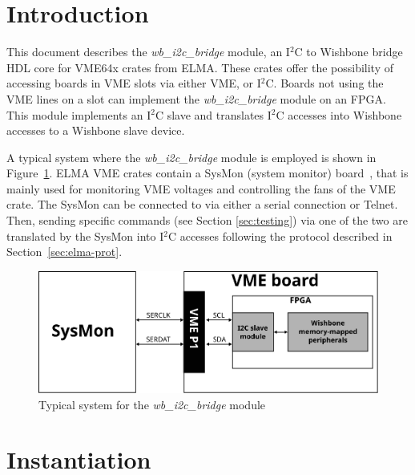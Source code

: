 \documentclass[a4paper,11pt]{article}
\begin{document}
\pagebreak
{}
\setcounter{page}{1}

\section{Introduction}
\label{sec:intro}

This document describes the \textit{wb\_i2c\_bridge} module, an I$^2$C to Wishbone
bridge HDL core for VME64x crates from ELMA. These crates offer the possibility of accessing
boards in VME slots via either VME, or I$^2$C. Boards not using the VME lines
on a slot can implement the \textit{wb\_i2c\_bridge} module on an FPGA. This module
implements an I$^2$C slave and translates I$^2$C accesses into Wishbone \cite{wb-spec}
accesses to a Wishbone slave device.

A typical system where the \textit{wb\_i2c\_bridge} module is employed is shown in
Figure~\ref{fig:sys}. ELMA VME crates contain a SysMon (system monitor) board~\cite{sysmon},
that is mainly used for monitoring VME voltages and controlling the fans of the VME crate.
The SysMon can be connected to via either a serial connection or Telnet. Then, sending
specific commands (see Section \ref{sec:testing}) via one of the two are translated by the
SysMon into I$^2$C accesses following the protocol described in Section~\ref{sec:elma-prot}.

\begin{figure}[h]
  \centerline{\includegraphics[width=\textwidth]{fig/sys}}
  \caption{Typical system for the \textit{wb\_i2c\_bridge} module}
  \label{fig:sys}
\end{figure}

\section{Instantiation}
\label{sec:instantiation}
\end{document}
